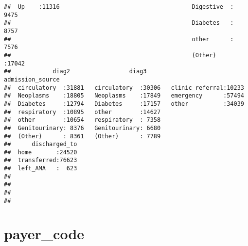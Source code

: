 \documentclass[]{article}
\newenvironment{Shaded}{\begin{snugshade}}{\end{snugshade}}
\newcommand{\KeywordTok}[1]{\textcolor[rgb]{0.13,0.29,0.53}{\textbf{#1}}}
\newcommand{\DataTypeTok}[1]{\textcolor[rgb]{0.13,0.29,0.53}{#1}}
\newcommand{\StringTok}[1]{\textcolor[rgb]{0.31,0.60,0.02}{#1}}
\newcommand{\OperatorTok}[1]{\textcolor[rgb]{0.81,0.36,0.00}{\textbf{#1}}}
\newcommand{\NormalTok}[1]{#1}
\begin{document}
\begin{verbatim}
##  Up    :11316                                      Digestive  : 9475  
##                                                    Diabetes   : 8757  
##                                                    other      : 7576  
##                                                    (Other)    :17042  
##            diag2                 diag3              admission_source
##  circulatory  :31881   circulatory  :30306   clinic_referral:10233  
##  Neoplasms    :18805   Neoplasms    :17849   emergency      :57494  
##  Diabetes     :12794   Diabetes     :17157   other          :34039  
##  respiratory  :10895   other        :14627                          
##  other        :10654   respiratory  : 7358                          
##  Genitourinary: 8376   Genitourinary: 6680                          
##  (Other)      : 8361   (Other)      : 7789                          
##      discharged_to  
##  home       :24520  
##  transferred:76623  
##  left_AMA   :  623  
##                     
##                     
##                     
## 
\end{verbatim}

\section{payer\_code}\label{payer_code}

\begin{Shaded}
\end{Shaded}
\end{document}
